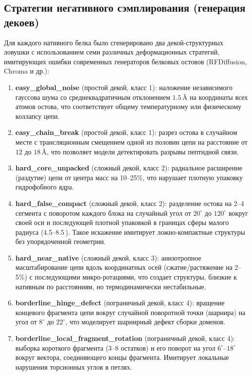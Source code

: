 \documentclass[12pt, a4paper]{article}
\begin{document}
\subsection{Стратегии негативного сэмплирования (генерация декоев)}
Для каждого нативного белка было сгенерировано два декой-структурных ловушки с использованием семи различных деформационных стратегий, имитирующих ошибки современных генераторов белковых остовов (RFDiffusion, Chroma и др.):
\begin{enumerate}
    \item \textbf{easy\_global\_noise} (простой декой, класс 1): наложение независимого гауссова шума со среднеквадратичным отклонением $1.5\,\text{\AA}$ на координаты всех атомов остова, что соответствует общему температурному или физическому коллапсу цепи.
    \item \textbf{easy\_chain\_break} (простой декой, класс 1): разрез остова в случайном месте с трансляционным смещением одной из половин цепи на расстояние от $12$ до $18\,\text{\AA}$, что позволяет модели детектировать разрывы пептидной связи.
    \item \textbf{hard\_core\_unpacked} (сложный декой, класс 2): радиальное расширение (раздутие) цепи от центра масс на 10--25\%, что нарушает плотную упаковку гидрофобного ядра.
    \item \textbf{hard\_false\_compact} (сложный декой, класс 2): разделение остова на 2--4 сегмента с поворотом каждого блока на случайный угол от $20^\circ$ до $120^\circ$ вокруг своей оси и последующей плотной упаковкой в границах сферы малого радиуса (4.5--8.5\,\text{\AA}). Такое искажение имитирует ложно-компактные структуры без упорядоченной геометрии.
    \item \textbf{hard\_near\_native} (сложный декой, класс 3): анизотропное масштабирование цепи вдоль координатных осей (сжатие/растяжение на 2--5\%) с последующими микро-ротациями, что создает структуры, близкие к нативным по расстояниям, но термодинамически нестабильные.
    \item \textbf{borderline\_hinge\_defect} (пограничный декой, класс 4): вращение концевого фрагмента цепи вокруг случайной поворотной точки (шарнира) на угол от $8^\circ$ до $22^\circ$, что моделирует шарнирный дефект сборки доменов.
    \item \textbf{borderline\_local\_fragment\_rotation} (пограничный декой, класс 4): выборка короткого фрагмента (3--8 остатков) и его поворот на угол $6^\circ$--$18^\circ$ вокруг вектора, соединяющего концы фрагмента. Имитирует локальные нарушения торсионных углов в петлях.
\end{enumerate}
\end{document}
